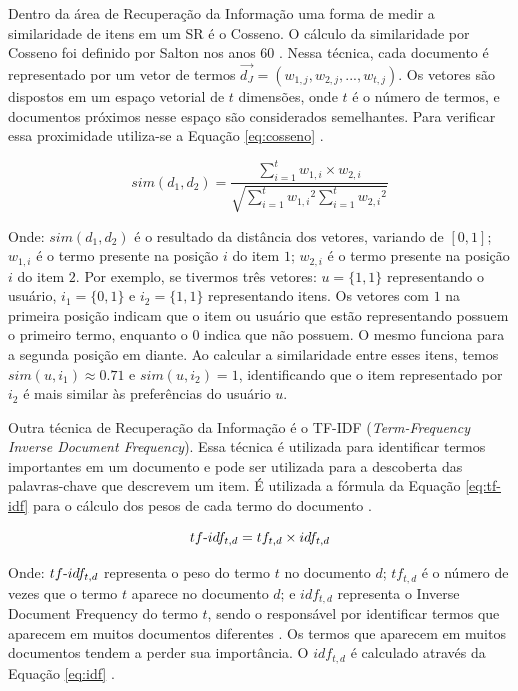Dentro da área de Recuperação da Informação uma forma de medir a similaridade de itens em um SR é o Cosseno. O cálculo
da similaridade por Cosseno foi definido por Salton nos anos 60 \cite{salton1964document}. Nessa técnica, cada documento
é representado por um vetor de termos $\vec{d_J} = (w_{1,j}, w_{2,j}, ..., w_{t,j})$. Os vetores são dispostos em um
espaço vetorial de $t$ dimensões, onde $t$ é o número de termos, e documentos próximos nesse espaço são considerados
semelhantes. Para verificar essa proximidade utiliza-se a Equação \ref{eq:cosseno} \cite{christopher2008introduction}.

\begin{equation}
  sim(d_1, d_2) = \frac{\sum_{i=1}^{t}{w_{1,i} \times w_{2,i}}}{\sqrt{\sum_{i=1}^{t}{w_{1,i}}^2 \sum_{i=1}^{t}{w_{2,i}}^2}}
  \label{eq:cosseno}
\end{equation}


Onde: $sim(d_1, d_2)$ é o resultado da distância dos vetores, variando de $[0,1]$; $w_{1,i}$ é o termo presente na
posição $i$ do item $1$; $w_{2,i}$ é o termo presente na posição $i$ do item $2$. Por exemplo, se tivermos três vetores: $u = \{1,1\}$
representando o usuário, $i_1 = \{0, 1\}$ e $i_2 = \{1, 1\}$ representando itens. Os vetores com $1$ na primeira posição
indicam que o item ou usuário que estão representando possuem o primeiro termo, enquanto o $0$ indica que não possuem. O mesmo
funciona para a segunda posição em diante. Ao calcular a similaridade entre esses itens, temos $sim(u, i_1) \approx 0.71$
e $sim(u, i_2) = 1$, identificando que o item representado por $i_2$ é mais similar às preferências do usuário $u$.

Outra técnica de Recuperação da Informação é o TF-IDF (\textit{Term-Frequency Inverse Document Frequency}). Essa técnica
é utilizada para identificar termos importantes em um documento \cite{christopher2008introduction} e pode ser utilizada
para a descoberta das palavras-chave que descrevem um item. É utilizada a fórmula da Equação \ref{eq:tf-idf} para o cálculo dos
pesos de cada termo do documento \cite{christopher2008introduction}.

\begin{equation}
  tf\hbox{-}idf_{t,d} = tf_{t,d} \times idf_{t,d}
  \label{eq:tf-idf}
\end{equation}

Onde: $tf\hbox{-}idf_{t,d}$ representa o peso do termo $t$ no documento $d$; $tf_{t,d}$ é o número de vezes que o termo
$t$ aparece no documento $d$; e $idf_{t,d}$ representa o Inverse Document Frequency do termo $t$, sendo o responsável por
identificar termos que aparecem em muitos documentos diferentes \cite{christopher2008introduction}. Os termos que aparecem em muitos
documentos tendem a perder sua importância. O $idf_{t,d}$ é calculado através da Equação \ref{eq:idf} \cite{christopher2008introduction}.


